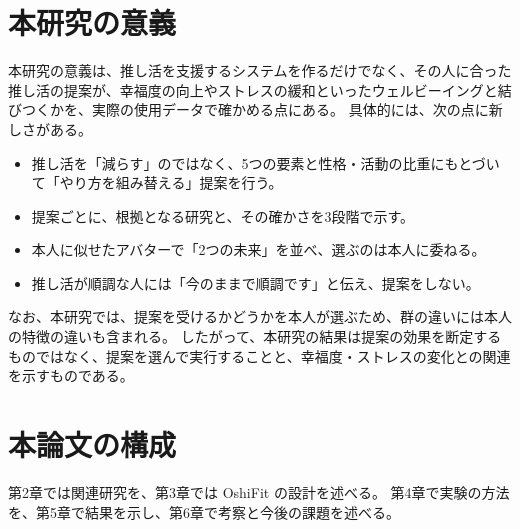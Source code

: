 \section{本研究の意義}
本研究の意義は、推し活を支援するシステムを作るだけでなく、その人に合った推し活の提案が、幸福度の向上やストレスの緩和といったウェルビーイングと結びつくかを、実際の使用データで確かめる点にある。
具体的には、次の点に新しさがある。
\begin{itemize}
  \item 推し活を「減らす」のではなく、5つの要素と性格・活動の比重にもとづいて「やり方を組み替える」提案を行う。
  \item 提案ごとに、根拠となる研究と、その確かさを3段階で示す。
  \item 本人に似せたアバターで「2つの未来」を並べ、選ぶのは本人に委ねる。
  \item 推し活が順調な人には「今のままで順調です」と伝え、提案をしない。
\end{itemize}

なお、本研究では、提案を受けるかどうかを本人が選ぶため、群の違いには本人の特徴の違いも含まれる。
したがって、本研究の結果は提案の効果を断定するものではなく、提案を選んで実行することと、幸福度・ストレスの変化との関連を示すものである。

\section{本論文の構成}
第2章では関連研究を、第3章では OshiFit の設計を述べる。
第4章で実験の方法を、第5章で結果を示し、第6章で考察と今後の課題を述べる。
